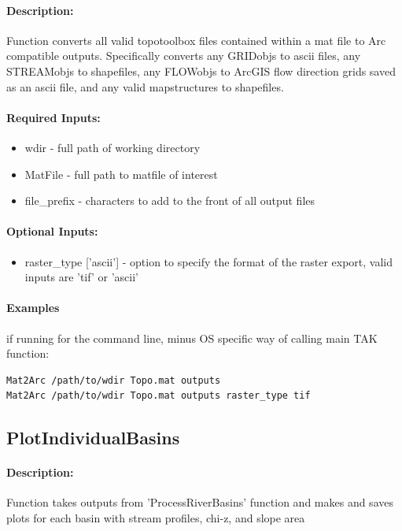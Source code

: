 \paragraph{Description:}
Function converts all valid topotoolbox files contained within a mat file
to Arc compatible outputs. Specifically converts any GRIDobjs to
ascii files, any STREAMobjs to shapefiles, any FLOWobjs to ArcGIS 
flow direction grids saved as an ascii file, and any valid mapstructures
to shapefiles.

\paragraph{Required Inputs:}
\begin{itemize}
\item wdir - full path of working directory
\item MatFile - full path to matfile of interest
\item file\_prefix - characters to add to the front of all output files
\end{itemize}

\paragraph{Optional Inputs:}
\begin{itemize}
	\item raster\_type ['ascii'] - option to specify the format of the raster export, valid inputs are 'tif' or 'ascii'
\end{itemize}

\paragraph{Examples} if running for the command line, minus OS specific way of calling main TAK function:
\begin{lstlisting}[language=bash]
Mat2Arc /path/to/wdir Topo.mat outputs
Mat2Arc /path/to/wdir Topo.mat outputs raster_type tif
\end{lstlisting}

\subsection{PlotIndividualBasins}
\paragraph{Description:}
Function takes outputs from 'ProcessRiverBasins' function and makes and saves plots for each basin with stream profiles, chi-z, and slope area

